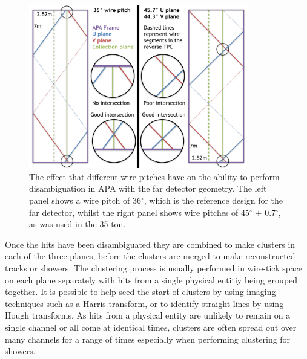 \begin{figure}[h]
  \centering
  \includegraphics[width=0.85\textwidth]{WireAngleCondition}
  \caption[Performing disambiguation with different wire pitches.]
          {The effect that different wire pitches have on the ability to perform disambiguation in APA with the far detector geometry. The left panel shows a wire pitch of 36$^{\circ}$, which is the reference design for the far detector, whilst the right panel shows wire pitches of 45$^{\circ}$ $\pm$ 0.7$^{\circ}$, as was used in the 35 ton.}
  \label{fig:WirePitches}
\end{figure}

Once the hits have been disambiguated they are combined to make clusters in each of the three planes, before the clusters are merged to make reconstructed tracks or showers. The clustering process is usually performed in wire-tick space on each plane separately with hits from a single physical entitiy being grouped together. It is possible to help seed the start of clusters by using imaging techniques such as a Harris transform, or to identify straight lines by using Hough transforms. As hits from a physical entity are unlikely to remain on a single channel or all come at identical times, clusters are often spread out over many channels for a range of times especially when performing clustering for showers. \\


